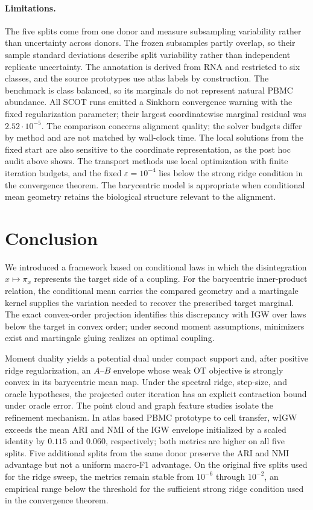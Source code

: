 \documentclass[11pt]{article}
\theoremstyle{plain}
\theoremstyle{definition}
\theoremstyle{remark}
\begin{document}
\paragraph{Limitations.}
The five splits come from one donor and measure subsampling variability rather
than uncertainty across donors. The frozen subsamples partly overlap, so their
sample standard deviations describe split variability rather than independent
replicate uncertainty. The annotation is derived from RNA and restricted to six
classes, and the source prototypes use atlas labels by construction. The benchmark is
class balanced, so its marginals do not represent natural PBMC abundance. All
SCOT runs emitted a Sinkhorn convergence warning with the fixed regularization
parameter;
their largest coordinatewise marginal residual was \(2.52\cdot10^{-5}\). The
comparison concerns alignment quality; the solver budgets differ by method and are
not matched by wall-clock time. The local solutions from the fixed start are also sensitive
to the coordinate representation, as the post hoc audit above shows. The transport
methods use local
optimization with finite iteration budgets, and the fixed
\(\varepsilon=10^{-4}\) lies below the strong ridge condition in the convergence
theorem. The barycentric model is appropriate when conditional mean geometry
retains the biological structure relevant to the alignment.

\FloatBarrier
\section{Conclusion}\label{sec:conclusion}

We introduced a framework based on conditional laws in which the disintegration
\(x\mapsto\pi_x\) represents the target side of a coupling. For the barycentric
inner-product relation, the conditional mean carries the compared geometry and a
martingale kernel supplies the variation needed to recover the prescribed target
marginal. The exact convex-order projection identifies this discrepancy with IGW over
laws below the target in convex order; under second moment assumptions, minimizers
exist and martingale gluing realizes an optimal coupling.

Moment duality yields a potential dual under compact support and, after positive ridge
regularization, an $A$--$B$ envelope whose weak OT objective is strongly convex
in its barycentric mean map. Under the spectral ridge, step-size, and oracle
hypotheses, the projected outer iteration has an explicit contraction bound under
oracle error. The point cloud and
graph feature studies isolate the refinement mechanism. In atlas based PBMC
prototype to cell transfer, wIGW exceeds the mean ARI and NMI of the IGW envelope
initialized by a scaled identity by \(0.115\) and \(0.060\), respectively; both
metrics are higher on all five splits.
Five additional splits from the same donor preserve the ARI and NMI advantage but not a
uniform macro-F1 advantage.
On the original five splits used for the ridge sweep, the metrics remain stable from \(10^{-6}\)
through \(10^{-2}\), an empirical range
below the threshold for the sufficient strong ridge condition used in the convergence theorem.
\end{document}
